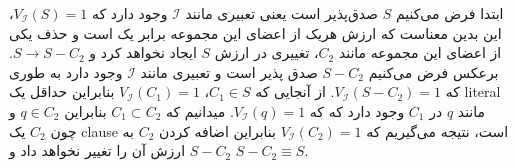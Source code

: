 \documentclass[]{exam}
\begin{document}
ابتدا فرض می‌کنیم $S$ صدق‌پذیر است یعنی تعبیری مانند $\mathscr{I}$ وجود دارد که
$V_{\mathscr{I}}(S) = 1$، این بدین معناست که ارزش هریک از اعضای این مجموعه برابر یک است
و حذف یکی از اعضای این مجموعه مانند $C_2$، تغییری در ارزش $S$ ایجاد نخواهد کرد
و $S \rightarrow S - C_2$.
برعکس فرض می‌کنیم $S - C_2$ صدق پذیر است و تعبیری مانند $\mathscr{I}$ وجود دارد
به طوری که $V_{\mathscr{I}}(S - C_2) = 1$.
از آنجایی که $C_1 \in S$، $V_{\mathscr{I}}(C_1) = 1$ بنابراین حداقل یک literal 
مانند $q$ در $C_1$ وجود دارد که
که $V_{\mathscr{I}}(q) = 1$. میدانیم که $C_1 \subset C_2$ بنابراین $q \in C_2$
و چون $C_2$ یک clause است، نتیجه می‌گیریم که $V_{\mathscr{I}}(C_2) = 1$
بنابراین اضافه کردن $C_2$ به $S - C_2$ ارزش آن را تغییر نخواهد داد
و $S - C_2 \equiv S$.
\end{document}
